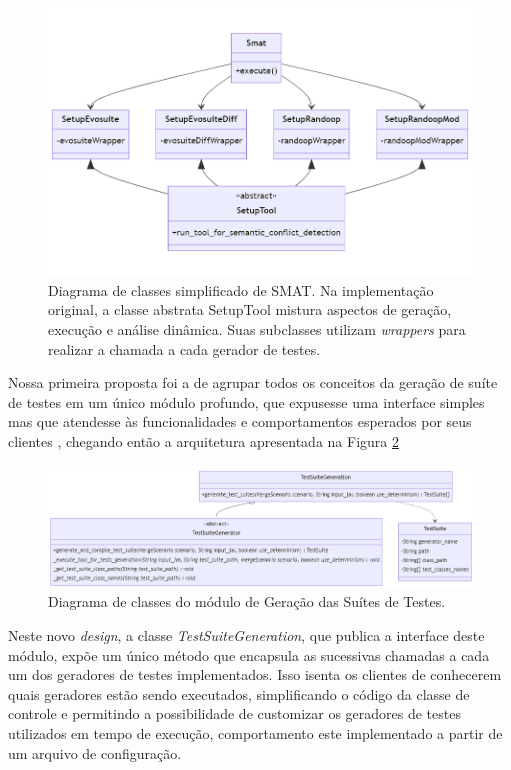 \documentclass[12pt]{article}
\begin{document}
\begin{figure}[H]
    \centering
    \includegraphics[width=\textwidth]{main.png}
    \caption{Diagrama de classes simplificado de SMAT. Na implementação original, a classe abstrata SetupTool mistura aspectos de geração, execução e análise dinâmica. Suas subclasses utilizam \textit{wrappers} para realizar a chamada a cada gerador de testes.}
    \label{fig:main}
\end{figure}

Nossa primeira proposta foi a de agrupar todos os conceitos da geração de suíte de testes em um único módulo profundo, que expusesse uma interface simples mas que atendesse às funcionalidades e comportamentos esperados por seus clientes \cite{ousterhout2018philosophy}, chegando então a arquitetura apresentada na Figura \ref{fig:tsg}

\begin{figure}[H]
    \centering
    \includegraphics[width=\textwidth]{tsg.png}
    \caption{Diagrama de classes do módulo de Geração das Suítes de Testes.}
    \label{fig:tsg}
\end{figure}

Neste novo \textit{design}, a classe \textit{TestSuiteGeneration}, que publica a interface deste módulo, expõe um único método que encapsula as sucessivas chamadas a cada um dos geradores de testes implementados. Isso isenta os clientes de conhecerem quais geradores estão sendo executados, simplificando o código da classe de controle e permitindo a possibilidade de customizar os geradores de testes utilizados em tempo de execução, comportamento este implementado a partir de um arquivo de configuração.
\end{document}
